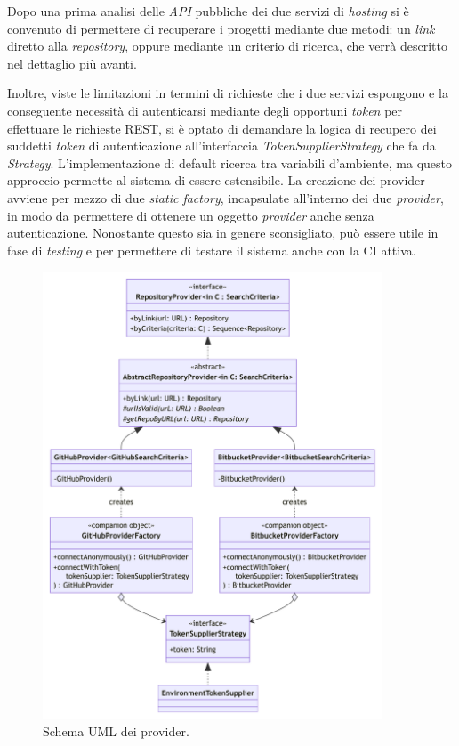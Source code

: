Dopo una prima analisi delle \textit{API} pubbliche dei due servizi di \textit{hosting} si è convenuto di permettere di recuperare i progetti mediante due metodi: un \textit{link} diretto alla \textit{repository}, oppure mediante un criterio di ricerca, che verrà descritto nel dettaglio più avanti.

Inoltre, viste le limitazioni in termini di richieste che i due servizi espongono e la conseguente necessità di autenticarsi mediante degli opportuni \textit{token} per effettuare le richieste REST, si è optato di demandare la logica di recupero dei suddetti \textit{token} di autenticazione all'interfaccia \textit{TokenSupplierStrategy} che fa da \textit{Strategy}. 
%
L'implementazione di default ricerca tra variabili d'ambiente, ma questo approccio permette al sistema di essere estensibile.
%
La creazione dei provider avviene per mezzo di due \textit{static factory}, incapsulate all'interno dei due \textit{provider}, in modo da permettere di ottenere un oggetto \textit{provider} anche senza autenticazione.
%
Nonostante questo sia in genere sconsigliato, può essere utile in fase di \textit{testing} e per permettere di testare il sistema anche con la CI attiva.

\begin{figure}[h!]
    \centering
    \includegraphics[width=0.9\textwidth]{resources/img/02-provider.pdf}
    \caption{Schema UML dei provider.}
    \label{img:02-provider}
\end{figure}
